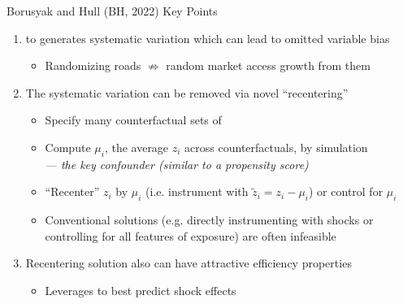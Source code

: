\documentclass{beamer}
\begin{document}
\begin{frame}{Borusyak and Hull (BH, 2022) Key Points}
	\begin{enumerate}
		\vspace{0.05cm}
	\item {} to  generates systematic variation which can lead to omitted variable bias\pause 
		\vspace{0.05cm}
		\begin{itemize}
		\item Randomizing roads $\not\Rightarrow$ random market access growth from them\pause 
		\end{itemize}
	\vspace{0.25cm}
	\item The systematic variation can be removed via novel ``recentering''\pause 
		\vspace{0.05cm}
		\begin{itemize}
		\item Specify many counterfactual sets of  
		\vspace{0.1cm}\pause 
		\item Compute $\mu_i$, the average $z_i$ across counterfactuals, by simulation \\ \pause{}\emph{--- the key confounder (similar to a propensity score)}
		\vspace{0.1cm}\pause 
		\item ``Recenter'' $z_i$ by $\mu_i$ (i.e. instrument with $\tilde{z}_i=z_i-\mu_i$) or control for $\mu_i$ 
		\vspace{0.1cm}\pause 
		\item Conventional solutions (e.g. directly instrumenting with shocks or controlling for all features of exposure) are often infeasible 		
		\end{itemize}
	\vspace{0.25cm}\pause 
	\item Recentering solution also can have attractive efficiency properties
		\begin{itemize}
		\item Leverages  to best predict shock effects
		\end{itemize}
	\end{enumerate}
\end{frame}
\end{document}
